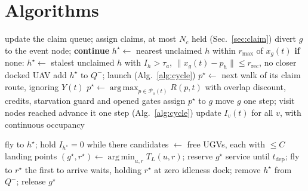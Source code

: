 \documentclass[11pt]{article}
\DeclareMathOperator*{\argmax}{arg\,max}
\DeclareMathOperator*{\argmin}{arg\,min}
\theoremstyle{definition}
\theoremstyle{plain}
\begin{document}
\section{Algorithms}

\begin{algorithm}[H]
\caption{Persistent patrolling (one time step)}
\label{alg:patrol}
\begin{algorithmic}[1]
\State update the claim queue; assign claims, at most $N_c$ held (Sec.~\ref{sec:claim})
    \State divert $g$ to the event node; \textbf{continue}
  \EndIf
    \State $h^\star \gets$ nearest unclaimed $h$ within $r_{\max}$ of $x_g(t)$
    \State \textbf{if} none: $h^\star \gets$ stalest unclaimed $h$ with $I_h > \tau_a$,
      $\|x_g(t) - p_h\| \leq r_{\mathrm{rec}}$, no closer docked UAV
     add $h^\star$ to $Q^-$; launch (Alg.~\ref{alg:cycle}) \EndIf
  \EndIf
      \State $p^\star \gets$ next walk of its claim route, ignoring $Y(t)$
    \Else
      \State $p^\star \gets \argmax_{p \in \mathcal{P}_o(t)} R(p, t)$ with overlap discount, credits, starvation guard and opened gates
    \EndIf
    \State assign $p^\star$ to $g$
  \EndIf
  \State move $g$ one step; visit nodes reached
\EndFor
{} advance it one step (Alg.~\ref{alg:cycle}) \EndFor
\State update $I_v(t)$ for all $v$, with continuous occupancy
\end{algorithmic}
\end{algorithm}

\begin{algorithm}[H]
\caption{UAV service cycle}
\label{alg:cycle}
\begin{algorithmic}[1]
\State fly to $h^\star$; hold $I_{h^\star} = 0$ while there
\State candidates $\gets$ free UGVs, each with $\leq C$ landing points
\State $(g^\star, r^\star) \gets \argmin_{u, r} T_L(u, r)$; reserve $g^\star$
\State service until $t_{\mathrm{dep}}$; fly to $r^\star$
\State the first to arrive waits, holding $r^\star$ at zero idleness
\State dock; remove $h^\star$ from $Q^-$; release $g^\star$
\end{algorithmic}
\end{algorithm}
\end{document}
